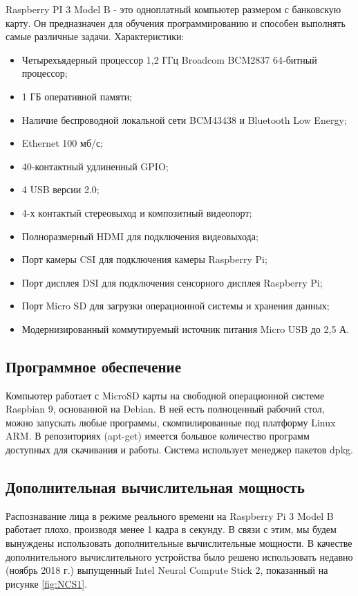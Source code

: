 \documentclass[12pt,a4paper]{scrartcl}
\begin{document}
		Raspberry PI 3 Model B - это одноплатный компьютер размером с банковскую карту. Он предназначен для обучения программированию и способен выполнять самые различные задачи\cite{bib:Raspberry_PI_Product_Page}.
		\newline \newline
		Характеристики:
		\begin{itemize}
			\item Четырехъядерный процессор 1,2 ГГц Broadcom BCM2837 64-битный процессор;
			\item 1 ГБ оперативной памяти;
			\item Наличие беспроводной локальной сети BCM43438 и Bluetooth Low Energy;
			\item Ethernet 100 мб/с;
			\item 40-контактный удлиненный GPIO;
			\item 4 USB версии 2.0;
			\item 4-х контактый стереовыход и композитный видеопорт;
			\item Полноразмерный HDMI для подключения видеовыхода;
			\item Порт камеры CSI для подключения камеры Raspberry Pi;
			\item Порт дисплея DSI для подключения сенсорного дисплея Raspberry Pi;
			\item Порт Micro SD для загрузки операционной системы и хранения данных;
			\item Модернизированный коммутируемый источник питания Micro USB до 2,5 А.
		\end{itemize}
	
	\subsection{Программное обеспечение}
	
		Компьютер работает с MicroSD карты на свободной операционной системе Raspbian 9, основанной на Debian. В ней есть полноценный рабочий стол, можно запускать любые программы, скомпилированные под платформу Linux ARM. В репозиториях (apt-get) имеется большое количество программ доступных для скачивания и работы. Система использует менеджер пакетов dpkg\cite{bib:Raspbian_Specs}.
	
	\subsection{Дополнительная вычислительная мощность}
	
		Распознавание лица в режиме реального времени на Raspberry Pi 3 Model B работает плохо, производя менее 1 кадра в секунду\cite{bib:Raspberry_Face_Recognition}. В связи с этим, мы будем вынуждены использовать дополнительные вычислительные мощности. В качестве дополнительного вычислительного устройства было решено использовать недавно (ноябрь 2018 г.) выпущенный Intel Neural Compute Stick 2, показанный на рисунке \ref{fig:NCS1}. 
		
\end{document}
